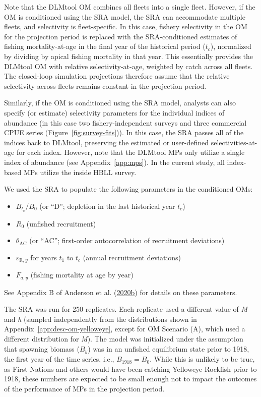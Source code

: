 \documentclass[11pt]{book}
\begin{document}
Note that the DLMtool OM combines all fleets into a single fleet. However, if the OM is conditioned using the SRA model, the SRA can accommodate multiple fleets, and selectivity is fleet-specific. In this case, fishery selectivity in the OM for the projection period is replaced with the SRA-conditioned estimates of fishing mortality-at-age in the final year of the historical period (\(t_c\)), normalized by dividing by apical fishing mortality in that year. This essentially provides the DLMtool OM with relative selectivity-at-age, weighted by catch across all fleets. The closed-loop simulation projections therefore assume that the relative selectivity across fleets remains constant in the projection period.

Similarly, if the OM is conditioned using the SRA model, analysts can also specify (or estimate) selectivity parameters for the individual indices of abundance (in this case two fishery-independent surveys and three commercial CPUE series (Figure~\ref{fig:survey-fits})). In this case, the SRA passes all of the indices back to DLMtool, preserving the estimated or user-defined selectivities-at-age for each index. However, note that the DLMtool MPs only utilize a single index of abundance (see Appendix~\ref{app:mps}). In the current study, all index-based MPs utilize the inside HBLL survey.

We used the SRA to populate the following parameters in the conditioned OMs:
\begin{itemize}

\item
  \(B_{t_c}/B_0\) (or ``D''; depletion in the last historical year \(t_c\))
\item
  \(R_0\) (unfished recruitment)
\item
  \(\theta_\textrm{AC}\) (or ``AC''; first-order autocorrelation of recruitment deviations)
\item
  \(\varepsilon_{\textrm{R},y}\) for years \(t_1\) to \(t_c\) (annual recruitment deviations)
\item
  \(F_{a,y}\) (fishing mortality at age by year)
\end{itemize}
See Appendix B of Anderson et al. (\protect\hyperlink{ref-anderson2020gfmp}{2020}\protect\hyperlink{ref-anderson2020gfmp}{b}) for details on these parameters.

The SRA was run for 250 replicates. Each replicate used a different value of \emph{M} and \emph{h} (sampled independently from the distributions shown in Appendix~\ref{app:desc-om-yelloweye}, except for OM Scenario (A), which used a different distribution for \emph{M}). The model was initialized under the assumption that spawning biomass (\(B_y\)) was in an unfished equilibrium state prior to 1918, the first year of the time series, i.e., \(B_{1918} = B_0\). While this is unlikely to be true, as First Nations and others would have been catching Yelloweye Rockfish prior to 1918, these numbers are expected to be small enough not to impact the outcomes of the performance of MPs in the projection period.
\end{document}
